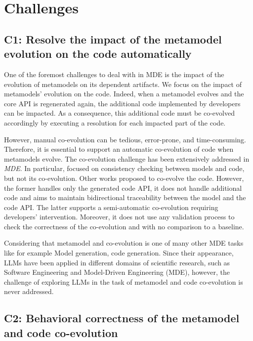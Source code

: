 \section*{Challenges}
\subsection*{C1: Resolve the impact of the metamodel evolution on the code automatically}
One of the foremost challenges to deal with in MDE is the impact of the evolution of metamodels on its dependent artifacts. We focus on the impact of metamodels' evolution on the code. 
Indeed, when a metamodel evolves and the core API is regenerated again, the additional code implemented by developers can be impacted.
	As a consequence, this additional code must be co-evolved accordingly by executing a resolution for each impacted part of the code.

However, manual co-evolution can be tedious, error-prone, and time-consuming. 
Therefore, it is essential to support an automatic co-evolution of code when metamodels evolve.
The co-evolution challenge has been extensively addressed in \emph{MDE}. 
In particular, \cite{riedl2014towards,kanakis2019empirical,pham2017bidirectional,jongeling2020towards,jongeling2022Structural,zaheri2021towards} focused on consistency checking between models and code, but not its co-evolution.
Other works \cite{yu2012maintaining,Khelladi2020} proposed to co-evolve the code. However, the former handles only the generated code API, it does not handle additional code and aims to maintain bidirectional traceability between the model and the code API. The latter supports a semi-automatic co-evolution requiring developers' intervention. Moreover, it does not use any validation process to check the correctness of the co-evolution and with no comparison to a baseline. 

 Considering that metamodel and co-evolution is one of many other MDE tasks like for example Model generation, code generation. Since their appearance, LLMs have been applied in different domains of scientific research, such as Software Engineering and Model-Driven Engineering (MDE), however, the challenge of exploring LLMs in the task of metamodel and code co-evolution is never addressed.

\subsection*{C2: Behavioral correctness of the metamodel and code co-evolution}

